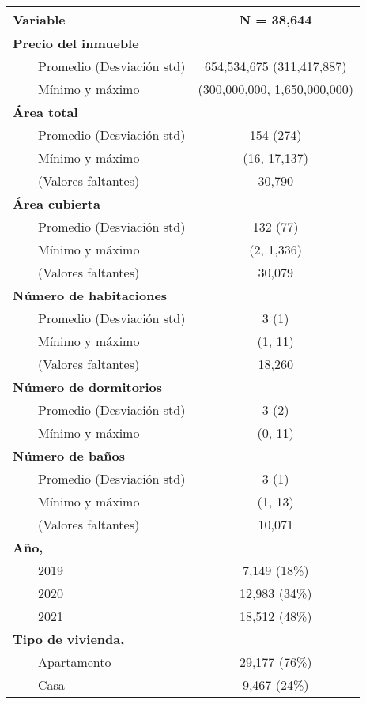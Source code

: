 \begin{longtable}{lc}
\toprule
\textbf{Variable} & \textbf{N = 38,644} \\ 
\midrule\addlinespace[2.5pt]
\textbf{Precio del inmueble} &  \\ 
    Promedio (Desviación std) & 654,534,675 (311,417,887) \\ 
    Mínimo y máximo & (300,000,000, 1,650,000,000) \\ 
\textbf{Área total} &  \\ 
    Promedio (Desviación std) & 154 (274) \\ 
    Mínimo y máximo & (16, 17,137) \\ 
    (Valores faltantes) & 30,790 \\ 
\textbf{Área cubierta} &  \\ 
    Promedio (Desviación std) & 132 (77) \\ 
    Mínimo y máximo & (2, 1,336) \\ 
    (Valores faltantes) & 30,079 \\ 
\textbf{Número de habitaciones} &  \\ 
    Promedio (Desviación std) & 3 (1) \\ 
    Mínimo y máximo & (1, 11) \\ 
    (Valores faltantes) & 18,260 \\ 
\textbf{Número de dormitorios} &  \\ 
    Promedio (Desviación std) & 3 (2) \\ 
    Mínimo y máximo & (0, 11) \\ 
\textbf{Número de baños} &  \\ 
    Promedio (Desviación std) & 3 (1) \\ 
    Mínimo y máximo & (1, 13) \\ 
    (Valores faltantes) & 10,071 \\ 
\textbf{Año, } &  \\ 
    2019 & 7,149  (18\%) \\ 
    2020 & 12,983  (34\%) \\ 
    2021 & 18,512  (48\%) \\ 
\textbf{Tipo de vivienda, } &  \\ 
    Apartamento & 29,177  (76\%) \\ 
    Casa & 9,467  (24\%) \\ 
\bottomrule
\end{longtable}

